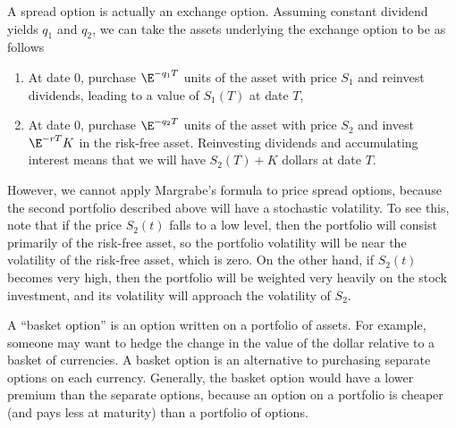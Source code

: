 A spread option is actually an exchange option.  Assuming constant dividend yields $q_1$ and $q_2$,  we can take the assets underlying the exchange option to be as follows
\begin{enumerate} 
\item At date 0, purchase $\E^{-q_1T}$ units of the asset with price $S_1$ and reinvest dividends, leading to a value of $S_1(T)$ at date $T$, 
\item At date 0, purchase $\E^{-q_2T}$ units of the asset with price $S_2$ and invest $\E^{-rT}K$ in the risk-free asset.  Reinvesting dividends and accumulating interest means that we will have $S_2(T)+K$ dollars at date $T$.
\end{enumerate}
However, we cannot apply Margrabe's formula to price spread options, because the second portfolio described above will have a stochastic volatility.  To see this, note that if the price $S_2(t)$ falls to a low level, then the portfolio will consist primarily of the risk-free asset, so the portfolio volatility will be near the volatility of the risk-free asset, which is zero.  On the other hand, if $S_2(t)$ becomes very high, then the portfolio will be weighted very heavily on the stock investment, and its volatility will approach the volatility of $S_2$.

A ``basket option'' is an option written on a portfolio of assets.  For example, someone may want to hedge the change in the value of the dollar relative to a basket of currencies.  A basket option is an alternative to purchasing separate options on each currency.  Generally, the basket option would have a lower premium than the separate options, because an option on a portfolio is cheaper (and pays less at maturity) than a portfolio of options.  

